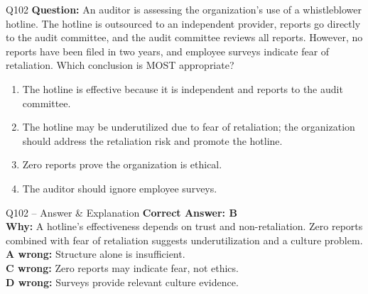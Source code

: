 \documentclass[aspectratio=169,10pt]{beamer}
\begin{document}
	\begin{frame}[t]{Q102}
		\small
		\textbf{Question:} An auditor is assessing the organization's use of a whistleblower hotline. The hotline is outsourced to an independent provider, reports go directly to the audit committee, and the audit committee reviews all reports. However, no reports have been filed in two years, and employee surveys indicate fear of retaliation. Which conclusion is MOST appropriate?
		\begin{enumerate}[label=\Alph*.,itemsep=1pt,topsep=2pt]
			\item The hotline is effective because it is independent and reports to the audit committee.
			\item The hotline may be underutilized due to fear of retaliation; the organization should address the retaliation risk and promote the hotline.
			\item Zero reports prove the organization is ethical.
			\item The auditor should ignore employee surveys.
		\end{enumerate}
	\end{frame}
	
	\begin{frame}[t]{Q102 -- Answer \& Explanation}
		\small
		\textbf{Correct Answer: B} \\[4pt]
		\textbf{Why:} A hotline's effectiveness depends on trust and non-retaliation. Zero reports combined with fear of retaliation suggests underutilization and a culture problem. \\[4pt]
		\textbf{A wrong:} Structure alone is insufficient. \\[2pt]
		\textbf{C wrong:} Zero reports may indicate fear, not ethics. \\[2pt]
		\textbf{D wrong:} Surveys provide relevant culture evidence.
	\end{frame}
	
\end{document}
